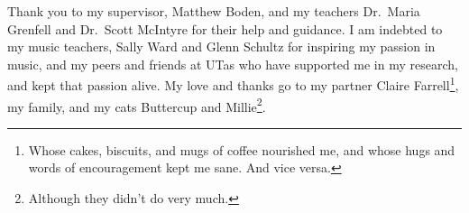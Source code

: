 \cleardoublepage{}
\begin{center}
	
	Thank you to my supervisor, Matthew Boden, and my teachers Dr.\ Maria Grenfell and Dr.\ Scott McIntyre for their help and guidance. 
	I am indebted to my music teachers, Sally Ward and Glenn Schultz for inspiring my passion in music, and my peers and friends at UTas who have supported me in my research, and kept that passion alive. 
	My love and thanks go to my partner Claire Farrell\footnote{Whose cakes, biscuits, and mugs of coffee nourished me, and whose hugs and words of encouragement kept me sane. And vice versa.}, my family, and my cats Buttercup and Millie\footnote{Although they didn't do very much.}.
	
\end{center}
\cleardoublepage{}
